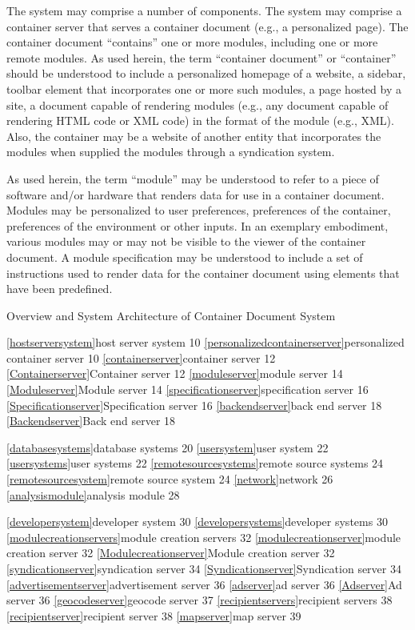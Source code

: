 The system may comprise a number of
components. The system may comprise a container server that serves a
container document (e.g., a personalized page). The container document
``contains'' one or more modules, including one or more
remote modules. As used herein, the term ``container
document'' or ``container'' should be understood to
include a personalized homepage of a website, a sidebar, toolbar
element that incorporates one or more such modules, a page hosted by a
site, a document capable of rendering modules (e.g., any document
capable of rendering HTML code or XML code) in the format of the
module (e.g., XML). Also, the container may be a website of another
entity that incorporates the modules when supplied the modules through
a syndication system.


As used herein, the
term ``module'' may be understood to refer to a piece of
software and/or hardware that renders data for use in a container
document. Modules may be personalized to user preferences, preferences
of the container, preferences of the environment or other inputs. In
an exemplary embodiment, various modules may or may not be visible to
the viewer of the container document. A module specification may be
understood to include a set of instructions used to render data for
the container document using elements that have been
predefined.

Overview and System Architecture of Container Document
System


\ref{hostserversystem}{host server system 10}
\ref{personalizedcontainerserver}{personalized container server 10}
\ref{containerserver}{container server 12}
\ref{Containerserver}{Container server 12}
\ref{moduleserver}{module server 14}
\ref{Moduleserver}{Module server 14}
\ref{specificationserver}{specification server 16}
\ref{Specificationserver}{Specification server 16}
\ref{backendserver}{back end server 18}
\ref{Backendserver}{Back end server 18}

\ref{databasesystems}{database systems 20}
\ref{usersystem}{user system 22}
\ref{usersystems}{user systems 22}
\ref{remotesourcesystems}{remote source systems 24}
\ref{remotesourcesystem}{remote source system 24}
\ref{network}{network 26}
\ref{analysismodule}{analysis module 28}

\ref{developersystem}{developer system 30}
\ref{developersystems}{developer systems 30}
\ref{modulecreationservers}{module creation servers 32}
\ref{modulecreationserver}{module creation server 32}
\ref{Modulecreationserver}{Module creation server 32}
\ref{syndicationserver}{syndication server 34}
\ref{Syndicationserver}{Syndication server 34}
\ref{advertisementserver}{advertisement server 36}
\ref{adserver}{ad server 36}
\ref{Adserver}{Ad server 36}
\ref{geocodeserver}{geocode server 37}
\ref{recipientservers}{recipient servers 38}
\ref{recipientserver}{recipient server 38}
\ref{mapserver}{map server 39}



